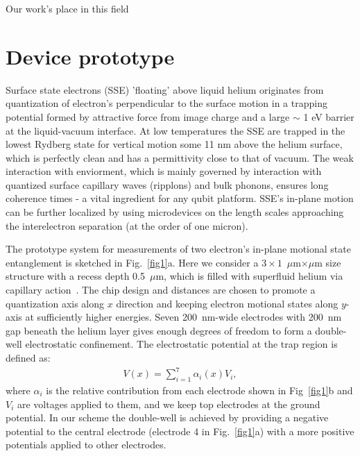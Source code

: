 \documentclass[twocolumn,superscriptaddress,unsortedaddress,
 amsmath,amssymb,
 aps,
]{revtex4-2}
\begin{document}
Our work's place in this field


\section{Device prototype} %
Surface state electrons (SSE) 'floating' above liquid helium originates from quantization of electron's perpendicular to the surface motion in a trapping potential formed by attractive force from image charge and a large $\sim$ 1 eV barrier at the liquid-vacuum interface. At low temperatures the SSE are trapped in the lowest Rydberg state for vertical motion some 11 nm above the helium surface, which is perfectly clean and has a permittivity close to that of vacuum. The weak interaction with enviorment, which is mainly governed by interaction with quantized surface capillary waves (ripplons) and bulk phonons, ensures long coherence times - a vital ingredient for any qubit platform. SSE's in-plane motion can be further localized by using microdevices on the length scales approaching the interelectron separation (at the order of one micron).

The prototype system for measurements of two electron's in-plane motional state entanglement is sketched in Fig.~\ref{fig1}a. Here we consider a $3 \times 1$~$\mu$m$\times\mu$m size structure with a recess depth 0.5~$\mu$m, which is filled with superfluid helium via capillary action~\cite{marty1986stability}. The chip design and distances are chosen to promote a quantization axis along $x$ direction and keeping electron motional states along $y$-axis at sufficiently higher energies. Seven 200~nm-wide electrodes with 200~nm gap beneath the helium layer gives enough degrees of freedom to form a double-well electrostatic confinement. The electrostatic potential at the trap region is defined as:
\begin{align}
            V(x) = \sum_{i=1}^7 \alpha_i(x) V_i,
            \label{eq:trap}
\end{align}
where $\alpha_i$ is the relative contribution from each electrode shown in Fig~\ref{fig1}b and $V_i$ are voltages applied to them, and we keep top electrodes at the ground potential. In our scheme the double-well is achieved by providing a negative potential to the central electrode (electrode 4 in Fig.~\ref{fig1}a) with a more positive potentials applied to other electrodes.
\end{document}

